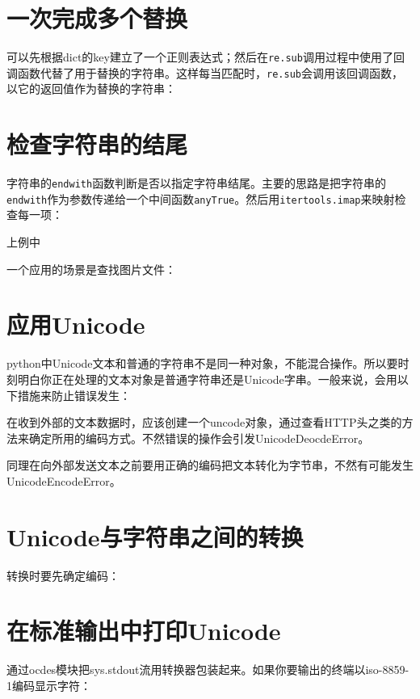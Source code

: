 	\section{一次完成多个替换}
		
		可以先根据dict的key建立了一个正则表达式；然后在\verb|re.sub|调用过程中使用了回调函数代替了用于替换的字符串。这样每当匹配时，\verb|re.sub|会调用该回调函数，以它的返回值作为替换的字符串：

		
		
	\section{检查字符串的结尾}
		
		字符串的\verb|endwith|函数判断是否以指定字符串结尾。主要的思路是把字符串的\verb|endwith|作为参数传递给一个中间函数\verb|anyTrue|。然后用\verb|itertools.imap|来映射检查每一项：

		

		上例中

		一个应用的场景是查找图片文件：

		

		
	\section{应用Unicode}

		python中Unicode文本和普通的字符串不是同一种对象，不能混合操作。所以要时刻明白你正在处理的文本对象是普通字符串还是Unicode字串。一般来说，会用以下措施来防止错误发生：

		在收到外部的文本数据时，应该创建一个uncode对象，通过查看HTTP头之类的方法来确定所用的编码方式。不然错误的操作会引发UnicodeDeocdeError。

		同理在向外部发送文本之前要用正确的编码把文本转化为字节串，不然有可能发生UnicodeEncodeError。
		
	\section{Unicode与字符串之间的转换}

		转换时要先确定编码：

		

	\section{在标准输出中打印Unicode}

		通过ocdes模块把sys.stdout流用转换器包装起来。如果你要输出的终端以iso-8859-1编码显示字符：


		

		

